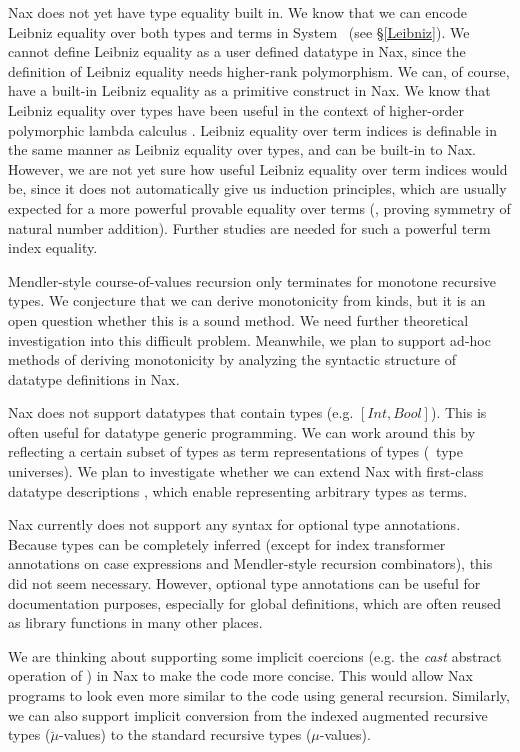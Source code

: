 Nax does not yet have type equality built in. We know that we can encode
Leibniz equality over both types and terms in System \Fi\ (see \S\ref{Leibniz}).
We cannot define Leibniz equality as a user defined datatype in Nax, since
the definition of Leibniz equality needs higher-rank polymorphism. We can,
of course, have a built-in Leibniz equality as a primitive construct in Nax.
We know that Leibniz equality over types have been useful in the context of
higher-order polymorphic lambda calculus \cite{vytiniotis2010parametricity}.
Leibniz equality over term indices is definable in the same manner
as Leibniz equality over types, and can be built-in to Nax. However,
we are not yet sure how useful Leibniz equality over term indices would be,
since it does not automatically give us induction principles, which are
usually expected for a more powerful provable equality over terms (\eg,
proving symmetry of natural number addition). Further studies are needed
for such a powerful term index equality.

Mendler-style course-of-values recursion only terminates
for monotone recursive types.
We conjecture that we can derive monotonicity from kinds,
but it is an open question whether this is a sound method. We need further
theoretical investigation into this difficult problem.
Meanwhile, we plan to support ad-hoc methods of deriving monotonicity
by analyzing the syntactic structure of datatype definitions in Nax.

Nax does not support datatypes that contain types (e.g. $[Int,Bool]$).
This is often useful for datatype generic programming. We can work around
this by reflecting a certain subset of types as term representations of types
(\aka\ type universes). We plan to investigate whether we can extend Nax with
first-class datatype descriptions \cite{DagMcb12}, which enable representing
arbitrary types as terms.

Nax currently does not support any syntax for optional type annotations.
Because types can be completely inferred (except for index transformer
annotations on case expressions and Mendler-style recursion combinators),
this did not seem necessary. However, optional type annotations can be useful
for documentation purposes, especially for global definitions, which are often
reused as library functions in many other places.

We are thinking about supporting some implicit coercions (e.g. the \textit{cast}
abstract operation of \MPr) in Nax to make the code more concise.
This would allow Nax programs to look even more similar to the code
using general recursion. Similarly, we can also support implicit conversion
from the indexed augmented recursive types ($\breve{\mu}$-values) to
the standard recursive types ($\mu$-values).


